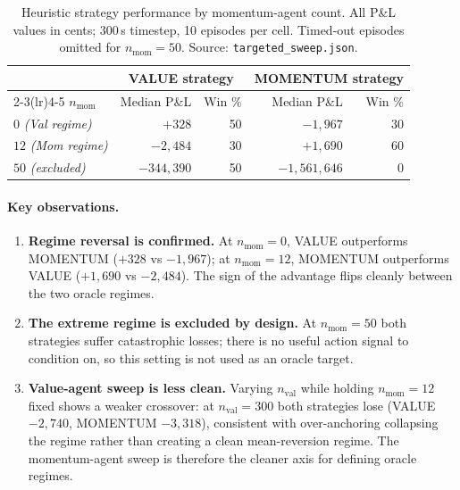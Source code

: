 \documentclass[11pt]{article}
\begin{document}
\begin{table}[H]
\centering
\begin{tabular}{lrrrr}
\toprule
& \multicolumn{2}{c}{\textbf{VALUE strategy}} &
  \multicolumn{2}{c}{\textbf{MOMENTUM strategy}} \\
\cmidrule(lr){2-3}\cmidrule(lr){4-5}
$n_\text{mom}$ & Median P\&L & Win \% & Median P\&L & Win \% \\
\midrule
$0$  \textit{(Val regime)}  & $+328$        & 50 & $-1{,}967$       & 30 \\
$12$ \textit{(Mom regime)}  & $-2{,}484$    & 30 & $+1{,}690$       & 60 \\
$50$ \textit{(excluded)}    & $-344{,}390$  & 50 & $-1{,}561{,}646$ & 0  \\
\bottomrule
\end{tabular}
\caption{Heuristic strategy performance by momentum-agent count.
         All P\&L values in cents; 300\,s timestep, 10 episodes per cell.
         Timed-out episodes omitted for $n_\text{mom}=50$.
         Source: \texttt{targeted\_sweep.json}.}
\label{tab:sweepregime}
\end{table}

\paragraph{Key observations.}
\begin{enumerate}
  \item \textbf{Regime reversal is confirmed.} At $n_\text{mom}=0$, VALUE
        outperforms MOMENTUM ($+328$ vs $-1{,}967$); at $n_\text{mom}=12$,
        MOMENTUM outperforms VALUE ($+1{,}690$ vs $-2{,}484$). The sign of
        the advantage flips cleanly between the two oracle regimes.
  \item \textbf{The extreme regime is excluded by design.} At
        $n_\text{mom}=50$ both strategies suffer catastrophic losses; there
        is no useful action signal to condition on, so this setting is not
        used as an oracle target.
  \item \textbf{Value-agent sweep is less clean.} Varying $n_\text{val}$
        while holding $n_\text{mom}=12$ fixed shows a weaker crossover:
        at $n_\text{val}=300$ both strategies lose (VALUE $-2{,}740$,
        MOMENTUM $-3{,}318$), consistent with over-anchoring collapsing the
        regime rather than creating a clean mean-reversion regime. The
        momentum-agent sweep is therefore the cleaner axis for defining
        oracle regimes.
\end{enumerate}
\end{document}
